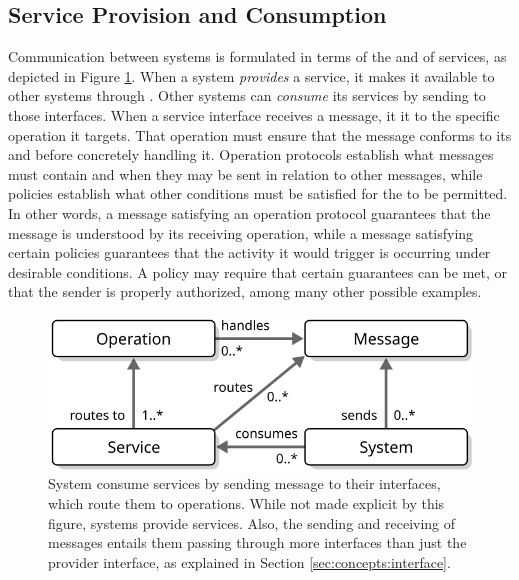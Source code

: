   \vspace*{-3mm}

\subsection{Service Provision and Consumption}

Communication between systems is formulated in terms of the  and  of services, as depicted in Figure \ref{fig:service-consumption}.
When a system \textit{provides} a service, it makes it available to other systems through .
Other systems can \textit{consume} its services by sending  to those interfaces.
When a service interface receives a message, it  it to the specific operation it targets.
That operation must ensure that the message conforms to its  and  before concretely handling it.
Operation protocols establish what messages must contain and when they may be sent in relation to other messages, while policies establish what other conditions must be satisfied for the  to be permitted.
In other words, a message satisfying an operation protocol guarantees that the message is understood by its receiving operation, while a message satisfying certain policies guarantees that the activity it would trigger is occurring under desirable conditions.
A policy may require that certain  guarantees can be met, or that the sender is properly authorized, among many other possible examples.

\begin{figure}[ht!]
  \centering
  \includegraphics[scale=0.9]{figures/service-consumption}
  \caption{
    System consume services by sending message to their interfaces, which route them to operations.
    While not made explicit by this figure, systems provide services.
    Also, the sending and receiving of messages entails them passing through more interfaces than just the provider interface, as explained in Section \ref{sec:concepts:interface}.
  }
  \label{fig:service-consumption}
\end{figure}

